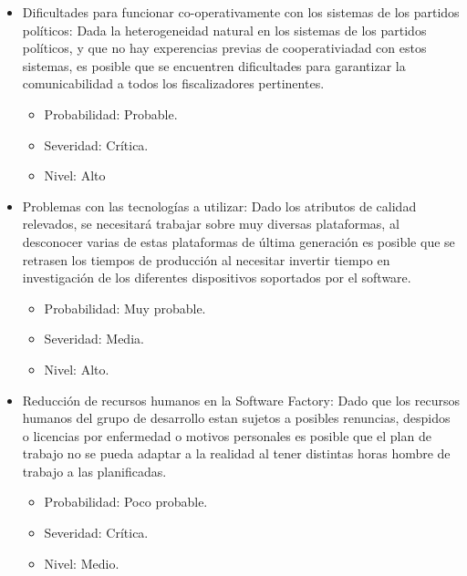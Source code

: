 \begin{itemize}
\item Dificultades para funcionar co-operativamente con los sistemas de los partidos pol\'iticos: Dada la heterogeneidad natural en los sistemas de los partidos pol\'iticos, y que no hay experencias previas de cooperativiadad con estos sistemas, es posible que se encuentren dificultades para garantizar la comunicabilidad a todos los fiscalizadores pertinentes. \begin{itemize}                                                                                                                                                                                                                                                                                                                                                                            									   \item Probabilidad: Probable.
                                                                           \item Severidad: Cr\'itica.
									   \item Nivel: Alto								\end{itemize}

\bigskip

\item Problemas con las tecnolog\'ias a utilizar: Dado los atributos de calidad relevados, se necesitar\'a trabajar sobre muy diversas plataformas, al desconocer varias de estas plataformas de \'ultima generaci\'on es posible que se retrasen los tiempos de producci\'on al necesitar invertir tiempo en investigaci\'on de los diferentes dispositivos soportados por el software. 
\begin{itemize}
\item Probabilidad: Muy probable.
\item Severidad: Media.
\item Nivel: Alto.
\end{itemize}

\bigskip

\item Reducci\'on de recursos humanos en la Software Factory: Dado que los recursos humanos del grupo de desarrollo estan sujetos a posibles renuncias, despidos o licencias por enfermedad o motivos personales es posible que el plan de trabajo no se pueda adaptar a la realidad al tener distintas horas hombre de trabajo a las planificadas.
\begin{itemize}
\item Probabilidad: Poco probable.
\item Severidad: Cr\'itica.
\item Nivel: Medio.
\end{itemize}


\end{itemize}
